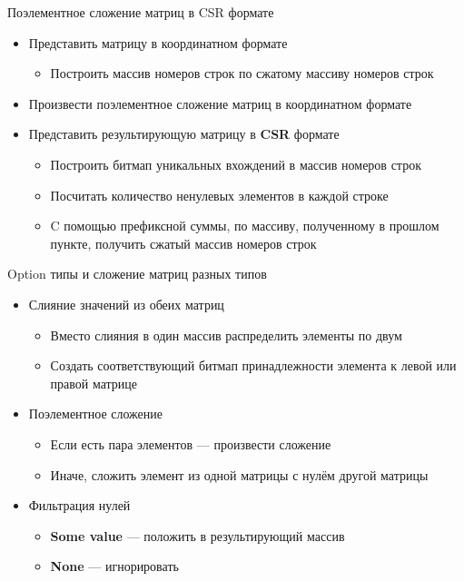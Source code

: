 \documentclass[aspectratio=169]{beamer}
\begin{document}
\begin{frame}{Поэлементное сложение матриц в CSR формате}

    \begin{itemize}
        \item Представить матрицу в координатном формате
        \begin{itemize}
            \item Построить массив номеров строк по сжатому массиву номеров строк
        \end{itemize}
        \item Произвести поэлементное сложение матриц в координатном формате
        \item Представить результирующую матрицу в \textbf{CSR} формате
        \begin{itemize}
            \item Построить битмап уникальных вхождений в массив номеров строк
            \item Посчитать количество ненулевых элементов в каждой строке
            \item C помощью префиксной суммы, по массиву, полученному в прошлом пункте, получить сжатый массив номеров строк
        \end{itemize}
    \end{itemize}
    
\end{frame}

\begin{frame}{Option типы и сложение матриц разных типов}

    \begin{itemize}
        \item Слияние значений из обеих матриц
        \begin{itemize}
            \item Вместо слияния в один массив распределить элементы по двум
            \item Создать соответствующий битмап принадлежности элемента к левой или правой матрице
        \end{itemize}
        \item Поэлементное сложение
        \begin{itemize}
            \item Если есть пара элементов --- произвести сложение
            \item Иначе, сложить элемент из одной матрицы с нулём другой матрицы
        \end{itemize}
        \item Фильтрация нулей
        \begin{itemize}
            \item \textbf{Some value} --- положить в результирующий массив
            \item \textbf{None} --- игнорировать
        \end{itemize}
    \end{itemize}
    
\end{frame}
\end{document}
